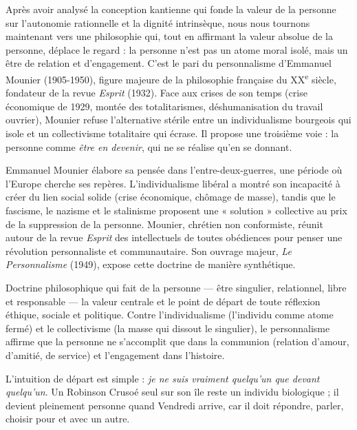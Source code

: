 \documentclass[11pt]{article}
\newcommand{\cle}[1]{{\popxbold\color{popdark}#1}}
\newcounter{popsec}
\newcounter{popsub}
\newcommand{\courssub}[1]{%
  \stepcounter{popsub}%
  \par\vspace{9pt}\noindent{\popxbold\fontsize{11.5}{13}\selectfont\color{popink}{\color{poporange}\thepopsec.\thepopsub}\hspace{6pt}#1}\par\nopagebreak\vspace{4pt}
}
\begin{document}
Après avoir analysé la conception kantienne qui fonde la valeur de la personne sur l'autonomie rationnelle et la dignité intrinsèque, nous nous tournons maintenant vers une philosophie qui, tout en affirmant la valeur absolue de la personne, déplace le regard : la personne n'est pas un atome moral isolé, mais un être de relation et d'engagement. C'est le pari du \cle{personnalisme} d'\cle{Emmanuel Mounier} (1905-1950), figure majeure de la philosophie française du XX\textsuperscript{e} siècle, fondateur de la revue \emph{Esprit} (1932). Face aux crises de son temps (crise économique de 1929, montée des totalitarismes, déshumanisation du travail ouvrier), Mounier refuse l'alternative stérile entre un individualisme bourgeois qui isole et un collectivisme totalitaire qui écrase. Il propose une troisième voie : la personne comme \emph{être en devenir}, qui ne se réalise qu'en se donnant.

\courssub{Contexte et naissance du personnalisme}

Emmanuel Mounier élabore sa pensée dans l'entre-deux-guerres, une période où l'Europe cherche ses repères. L'individualisme libéral a montré son incapacité à créer du lien social solide (crise économique, chômage de masse), tandis que le fascisme, le nazisme et le stalinisme proposent une « solution » collective au prix de la suppression de la personne. Mounier, chrétien non conformiste, réunit autour de la revue \emph{Esprit} des intellectuels de toutes obédiences pour penser une \cle{révolution personnaliste et communautaire}. Son ouvrage majeur, \emph{Le Personnalisme} (1949), expose cette doctrine de manière synthétique.

\begin{definition}[Le personnalisme]
Doctrine philosophique qui fait de la \cle{personne} — être singulier, relationnel, libre et responsable — la valeur centrale et le point de départ de toute réflexion éthique, sociale et politique. Contre l'individualisme (l'individu comme atome fermé) et le collectivisme (la masse qui dissout le singulier), le personnalisme affirme que la personne ne s'accomplit que dans la \cle{communion} (relation d'amour, d'amitié, de service) et l'\cle{engagement} dans l'histoire.
\end{definition}

L'intuition de départ est simple : \emph{je ne suis vraiment quelqu'un que devant quelqu'un}. Un Robinson Crusoé seul sur son île reste un individu biologique ; il devient pleinement personne quand Vendredi arrive, car il doit répondre, parler, choisir pour et avec un autre.
\end{document}
